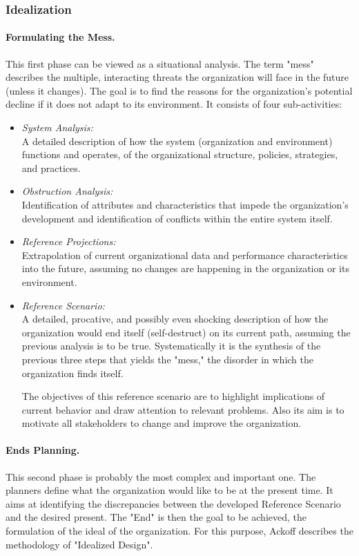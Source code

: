 \documentclass[a4paper,12pt]{article}
\begin{document}
\subsubsection{Idealization}
\paragraph{Formulating the Mess.} 
This first phase can be viewed as a situational analysis. The term "mess"
describes the multiple, interacting threats the organization will face in the
future (unless it changes). The goal is to find the reasons for the
organization's potential decline if it does not adapt to its environment. It
consists of four sub-activities:

\begin{itemize}
\item \emph{System Analysis:}\\ A detailed description of how the system
  (organization and environment) functions and operates, of the organizational
  structure, policies, strategies, and practices.

\item \emph{Obstruction Analysis:}\\ Identification of attributes and
  characteristics that impede the organization's development and
  identification of conflicts within the entire system itself.

\item \emph{Reference Projections:}\\ Extrapolation of current organizational
  data and performance characteristics into the future, assuming no changes
  are happening in the organization or its environment.

\item \emph{Reference Scenario:}\\ A detailed, procative, and possibly even
  shocking description of how the organization would end itself
  (self-destruct) on its current path, assuming the previous analysis is to be
  true. Systematically it is the synthesis of the previous three steps that
  yields the "mess," the disorder in which the organization finds itself.

  The objectives of this reference scenario are to highlight implications of
  current behavior and draw attention to relevant problems. Also its aim is to
  motivate all stakeholders to change and improve the organization.
\end{itemize}

\paragraph{Ends Planning.} 
This second phase is probably the most complex and important one. The planners
define what the organization would like to be at the present time. It aims at
identifying the discrepancies between the developed Reference Scenario and the
desired present. The "End" is then the goal to be achieved, the formulation of
the ideal of the organization.  For this purpose, Ackoff describes the
methodology of "Idealized Design".
\end{document}

